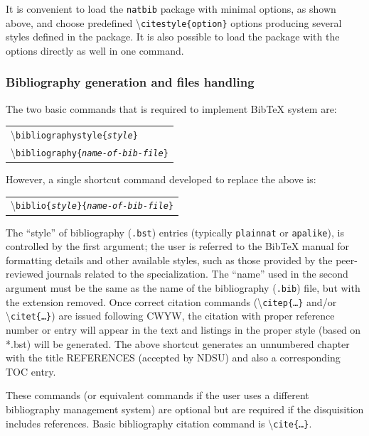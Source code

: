 \documentclass{article}
\newcommand\cmd[1]{\textbackslash\texttt{#1}}
\newcommand\ix[1]{#1\index{#1}} %
\newcommand\ixm[2]{#2\index{#1!#2}} %
\newcommand\ccmd[1]{ %
\begin{center}
\begin{tabular}{l}
#1
\end{tabular}
\end{center}
}
\begin{document}
It is convenient to load the \texttt{natbib} package with minimal options, as shown above, and choose predefined \cmd{citestyle\{option\}} options producing several styles defined in the package. It is also possible to load the package with the options directly as well in one command.

\subsubsection{Bibliography generation and files handling}
The two basic commands that is required to implement BibTeX system are:
\ccmd{
\cmd{bibliographystyle\{\textit{style}\}} \\
\cmd{bibliography\{\textit{name-of-bib-file}\}}
}

However, a single shortcut command developed to replace the above is:
\ccmd{
\cmd{\ixm{bibliography}{biblio}\{\textit{style}\}\{\textit{name-of-bib-file}\}}
}

The ``style'' of bibliography (\texttt{.bst}) entries (typically \texttt{plainnat} or \texttt{apalike}), is controlled by the first argument; the user is referred to the BibTeX manual for formatting details and other available styles, such as those provided by the peer-reviewed journals related to the specialization. The ``name'' used in the second argument must be the same as the name of the bibliography (\texttt{.bib}) file, but with the extension removed. Once correct citation commands (\cmd{\ix{citep}\{\ldots\}}  and/or \cmd{\ix{citet}\{\ldots\}}) are issued following CWYW, the citation with proper reference number or entry will appear in the text and listings in the proper style (based on *.bst) will be generated. The above shortcut generates an unnumbered chapter with the title REFERENCES (accepted by NDSU) and also a corresponding TOC entry.

These commands (or equivalent commands if the user uses a different bibliography management system) are optional but are required if the disquisition includes references. Basic bibliography citation command is \cmd{cite\{\ldots\}}.
 

\end{document}
